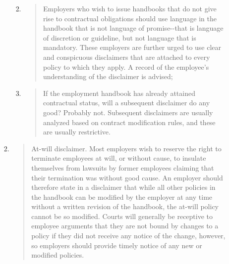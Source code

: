 \documentclass[]{article}
\begin{document}
\begin{enumerate}
\begin{enumerate}
\begin{enumerate}
      \begin{enumerate}
      \def\labelenumiv{\alph{enumiv}.}
      \item
        \begin{quote}
        Employers who wish to issue handbooks that do not give rise to
        contractual obligations should use language in the handbook that
        is not language of promise-\/-that is language of discretion or
        guideline, but not language that is mandatory. These employers
        are further urged to use clear and conspicuous disclaimers that
        are attached to every policy to which they apply. A record of
        the employee's understanding of the disclaimer is advised;
        \end{quote}
      \item
        \begin{quote}
        If the employment handbook has already attained contractual
        status, will a subsequent disclaimer do any good? Probably not.
        Subsequent disclaimers are usually analyzed based on contract
        modification rules, and these are usually restrictive.
        \end{quote}
      \end{enumerate}
    \item
      \begin{quote}
      At-will disclaimer. Most employers wish to reserve the right to
      terminate employees at will, or without cause, to insulate
      themselves from lawsuits by former employees claiming that their
      termination was without good cause. An employer should therefore
      state in a disclaimer that while all other policies in the
      handbook can be modified by the employer at any time without a
      written revision of the handbook, the at-will policy cannot be so
      modified. Courts will generally be receptive to employee arguments
      that they are not bound by changes to a policy if they did not
      receive any notice of the change, however, so employers should
      provide timely notice of any new or modified policies.
      \end{quote}
    \end{enumerate}
  \end{enumerate}
\end{enumerate}
\end{document}
